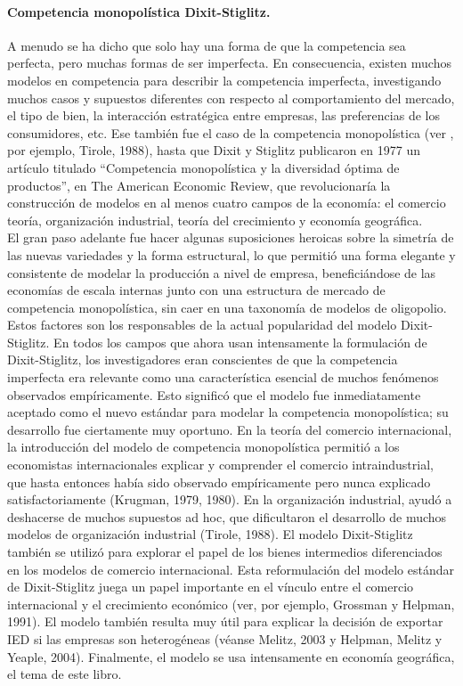 \paragraph{Competencia monopolística Dixit-Stiglitz.}
A menudo se ha dicho que solo hay una forma de que la competencia sea perfecta, pero muchas formas de ser imperfecta. En consecuencia, existen muchos modelos en competencia para describir la competencia imperfecta, investigando muchos casos y supuestos diferentes con respecto al comportamiento del mercado, el tipo de bien, la interacción estratégica entre empresas, las preferencias de los consumidores, etc. Ese también fue el caso de la competencia monopolística (ver , por ejemplo, Tirole, 1988), hasta que Dixit y Stiglitz publicaron en 1977 un artículo titulado “Competencia monopolística y la diversidad óptima de productos”, en The American Economic Review, que revolucionaría la construcción de modelos en al menos cuatro campos de la economía: el comercio teoría, organización industrial, teoría del crecimiento y economía geográfica.\\
El gran paso adelante fue hacer algunas suposiciones heroicas sobre la simetría de las nuevas variedades y la forma estructural, lo que permitió una forma elegante y consistente de modelar la producción a nivel de empresa, beneficiándose de las economías de escala internas junto con una estructura de mercado de competencia monopolística, sin caer en una taxonomía de modelos de oligopolio. Estos factores son los responsables de la actual popularidad del modelo Dixit-Stiglitz. En todos los campos que ahora usan intensamente la formulación de Dixit-Stiglitz, los investigadores eran conscientes de que la competencia imperfecta era relevante como una característica esencial de muchos fenómenos observados empíricamente. Esto significó que el modelo fue inmediatamente aceptado como el nuevo estándar para modelar la competencia monopolística; su desarrollo fue ciertamente muy oportuno. En la teoría del comercio internacional, la introducción del modelo de competencia monopolística permitió a los economistas internacionales explicar y comprender el comercio intraindustrial, que hasta entonces había sido observado empíricamente pero nunca explicado satisfactoriamente (Krugman, 1979, 1980). En la organización industrial, ayudó a deshacerse de muchos supuestos ad hoc, que dificultaron el desarrollo de muchos modelos de organización industrial (Tirole, 1988). El modelo Dixit-Stiglitz también se utilizó para explorar el papel de los bienes intermedios diferenciados en los modelos de comercio internacional. Esta reformulación del modelo estándar de Dixit-Stiglitz juega un papel importante en el vínculo entre el comercio internacional y el crecimiento económico (ver, por ejemplo, Grossman y Helpman, 1991). El modelo también resulta muy útil para explicar la decisión de exportar IED si las empresas son heterogéneas (véanse Melitz, 2003 y Helpman, Melitz y Yeaple, 2004). Finalmente, el modelo se usa intensamente en economía geográfica, el tema de este libro.

